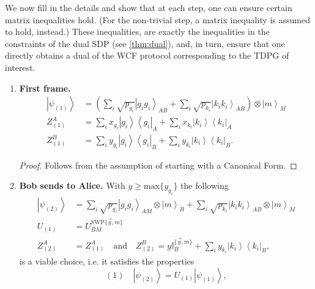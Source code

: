 \documentclass{article}
\newcommand{\atul}[1]{#1} %
\begin{document}
We now fill in the  details and show that at each step, one can ensure certain matrix inequalities hold. (For the non-trivial step, a matrix inequality is assumed to hold, instead.) These inequalities, \atul{are exactly the inequalities in the constraints of the dual SDP (see \cref{thm:dual})}, and, in turn, ensure that one directly obtains a dual of the WCF protocol corresponding to the TDPG of interest.
%

\begin{enumerate}
  \item \textbf{First frame.}
        \begin{align*}
          \left|\psi_{(1)}\right\rangle & =\left(\sum_{i}\sqrt{p_{g_{i}}}\left|g_{i}g_{i}\right\rangle _{AB}+\sum_{i}\sqrt{p_{k_{i}}}\left|k_{i}k_{i}\right\rangle _{AB}\right)\otimes\left|m\right\rangle _{M} \\
          Z_{(1)}^{A}                   & =\sum_{i}x_{g_{i}}\left|g_{i}\right\rangle \left\langle g_{i}\right|_{A}+\sum_{i}x_{k_{i}}\left|k_{i}\right\rangle \left\langle k_{i}\right|_{A}                      \\
          Z_{(1)}^{B}                   & =\sum_{i}y_{g_{i}}\left|g_{i}\right\rangle \left\langle g_{i}\right|_{B}+\sum_{i}y_{k_{i}}\left|k_{i}\right\rangle \left\langle k_{i}\right|_{B}.
        \end{align*}
        \begin{proof}
          Follows from the assumption of starting with a Canonical Form.
        \end{proof}
  \item \textbf{Bob sends to Alice.} With $y\ge\text{max}\{y_{g_{i}}\}$ the
        following
        \begin{align*}
          \left|\psi_{(2)}\right\rangle & =\sum_{i}\sqrt{p_{g_{i}}}\left|g_{i}g_{i}\right\rangle _{AM}\otimes\left|m\right\rangle _{B}+\sum_{i}\sqrt{p_{k_{i}}}\left|k_{i}k_{i}\right\rangle _{AB}\otimes\left|m\right\rangle _{M} \\
          U_{(1)}                       & =U_{BM}^{\text{SWP}\{\vec{g},m\}}                                                                                                                                                        \\
          Z_{(2)}^{A}                   & =Z_{(1)}^{A}\ \ \ \text{ and }\ \ \
          Z_{(2)}^{B}  =y\mathbb{I}_{B}^{\{\vec{g},m\}}+\sum_{i}y_{k_{i}}\left|k_{i}\right\rangle \left\langle k_{i}\right|_{B},
        \end{align*}
        is a viable choice, i.e. it satisfies the properties  $$(1)\quad \left|\psi_{(2)}\right\rangle =U_{(1)}\left|\psi_{(1)}\right\rangle, $$

\end{enumerate}
\end{document}
